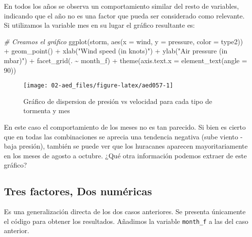 \documentclass[
]{book}
\newenvironment{Shaded}{\begin{snugshade}}{\end{snugshade}}
\newcommand{\AttributeTok}[1]{\textcolor[rgb]{0.77,0.63,0.00}{#1}}
\newcommand{\CommentTok}[1]{\textcolor[rgb]{0.56,0.35,0.01}{\textit{#1}}}
\newcommand{\DecValTok}[1]{\textcolor[rgb]{0.00,0.00,0.81}{#1}}
\newcommand{\FunctionTok}[1]{\textcolor[rgb]{0.00,0.00,0.00}{#1}}
\newcommand{\NormalTok}[1]{#1}
\newcommand{\SpecialCharTok}[1]{\textcolor[rgb]{0.00,0.00,0.00}{#1}}
\newcommand{\StringTok}[1]{\textcolor[rgb]{0.31,0.60,0.02}{#1}}
\begin{document}
En todos los años se observa un comportamiento similar del resto de variables, indicando que el año no es una factor que pueda ser considerado como relevante. Si utilizamos la variable mes en su lugar el gráfico resultante es:

\begin{Shaded}
\begin{Highlighting}[]
\CommentTok{\# Creamos el gráfico}
\FunctionTok{ggplot}\NormalTok{(storm, }\FunctionTok{aes}\NormalTok{(}\AttributeTok{x =}\NormalTok{ wind, }\AttributeTok{y =}\NormalTok{ pressure, }\AttributeTok{color =}\NormalTok{ type2))  }\SpecialCharTok{+}
  \FunctionTok{geom\_point}\NormalTok{() }\SpecialCharTok{+} 
  \FunctionTok{xlab}\NormalTok{(}\StringTok{"Wind speed (in knots)"}\NormalTok{) }\SpecialCharTok{+}
  \FunctionTok{ylab}\NormalTok{(}\StringTok{"Air pressure (in mbar)"}\NormalTok{) }\SpecialCharTok{+}
  \FunctionTok{facet\_grid}\NormalTok{(. }\SpecialCharTok{\textasciitilde{}}\NormalTok{ month\_f) }\SpecialCharTok{+}
  \FunctionTok{theme}\NormalTok{(}\AttributeTok{axis.text.x =} \FunctionTok{element\_text}\NormalTok{(}\AttributeTok{angle =} \DecValTok{90}\NormalTok{))}
\end{Highlighting}
\end{Shaded}

\begin{figure}

{\centering \texttt{[image: 02-aed\_files/figure-latex/aed057-1]} 

}

\caption{Gráfico de dispersion de presión vs velocidad para cada tipo de tormenta y mes}\label{fig:aed057}
\end{figure}

En este caso el comportamiento de los meses no es tan parecido. Si bien es cierto que en todas las combinaciones se aprecia una tendencia negativa (sube viento - baja presión), también se puede ver que los huracanes aparecen mayoritariamente en los meses de agosto a octubre. ¿Qué otra información podemos extraer de este gráfico?

\hypertarget{tres-factores-dos-numuxe9ricas}{%
\subsection{Tres factores, Dos numéricas}\label{tres-factores-dos-numuxe9ricas}}

Es una generalización directa de los dos casos anteriores. Se presenta únicamente el código para obtener los resultados. Añadimos la variable \texttt{month\_f} a las del caso anterior.
\end{document}
